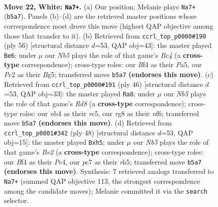 \documentclass[11pt]{article}
\begin{document}
\clearpage

\begin{figure}[p]\centering
\begin{subfigure}{0.46\textwidth}\centering
\resizebox{\linewidth}{!}{%
\newchessgame
\chessboard[
  setfen={2k3r1/1ppnp2p/6p1/pN6/1n3B1P/5P2/P1P1KP2/R7 w - - 1 22},
  showmover=false,
  pgfstyle=straightmove, color=movearrow, markmove={b5-a7}
]}
\caption{}
\end{subfigure}\hfill
\begin{subfigure}{0.46\textwidth}\centering
\resizebox{\linewidth}{!}{%
\newchessgame
\chessboard[
  setfen={5b2/1p1r2k1/p5p1/P5Bp/2B1p1n1/1PP5/6PP/R6K w - - 0 29},
  showmover=false,
  pgfstyle=straightmove, color=movearrow, markmove={c4-e6}
]}
\caption{}
\end{subfigure}
\\[4pt]
\begin{subfigure}{0.46\textwidth}\centering
\resizebox{\linewidth}{!}{%
\newchessgame
\chessboard[
  setfen={3R4/1p3ppk/4pn1p/p1r5/P7/1BP2P1P/1P3P2/6K1 w - - 2 24},
  showmover=false,
  pgfstyle=straightmove, color=movearrow, markmove={d8-a8}
]}
\caption{}
\end{subfigure}\hfill
\begin{subfigure}{0.46\textwidth}\centering
\resizebox{\linewidth}{!}{%
\newchessgame
\chessboard[
  setfen={3r4/ppk2p2/3p4/2p4r/1nP5/4P3/P2KBPP1/R7 w - - 0 25},
  showmover=false,
  pgfstyle=straightmove, color=movearrow, markmove={e2-h5}
]}
\caption{}
\end{subfigure}
\caption{\textbf{Move 22, White: \texttt{Na7+}.} (a) Our position; Melanie plays \texttt{Na7+} (\texttt{b5a7}). Panels (b)--(d) are the retrieved master positions whose correspondence most drove this move (highest QAP objective among those that transfer to it). (b) Retrieved from \texttt{ccrl\_top\_p0000\#190} (ply 56) [structural distance $d$=53, QAP obj=43]: the master played \texttt{Be6}; under $\mu$ our \emph{Nb5} plays the role of that game's \emph{Bc4} (a \textbf{cross-type} correspondence); cross-type roles: our \emph{B}f4 as their \emph{P}a5, our \emph{P}c2 as their \emph{B}g5; transferred move \texttt{b5a7} \textbf{(endorses this move)}. (c) Retrieved from \texttt{ccrl\_top\_p0000\#191} (ply 46) [structural distance $d$=53, QAP obj=33]: the master played \texttt{Ra8}; under $\mu$ our \emph{Nb5} plays the role of that game's \emph{Rd8} (a \textbf{cross-type} correspondence); cross-type roles: our \emph{n}b4 as their \emph{r}c5, our \emph{r}g8 as their \emph{n}f6; transferred move \texttt{b5a7} \textbf{(endorses this move)}. (d) Retrieved from \texttt{ccrl\_top\_p0001\#342} (ply 48) [structural distance $d$=53, QAP obj=15]: the master played \texttt{Bxh5}; under $\mu$ our \emph{Nb5} plays the role of that game's \emph{Be2} (a \textbf{cross-type} correspondence); cross-type roles: our \emph{B}f4 as their \emph{P}c4, our \emph{p}c7 as their \emph{r}h5; transferred move \texttt{b5a7} \textbf{(endorses this move)}. Synthesis: 7 retrieved analogs transferred to \texttt{Na7+} (summed QAP objective 113, the strongest correspondence among the candidate moves); Melanie committed it via the \texttt{search} selector.}
\label{fig:thought-m42}
\end{figure}
\end{document}
